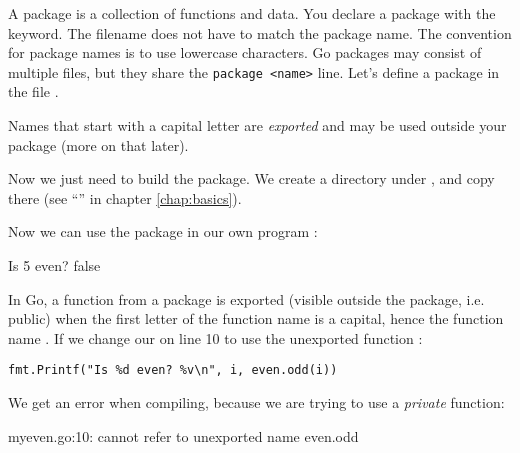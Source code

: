 \noindent{}A package is a collection of functions and data.
You declare a package with the
 keyword. The filename does not
have to match the package name.
The convention for package names is to use
lowercase characters.
Go packages may consist of multiple files,
but they share the \lstinline{package <name>} line.
Let's define a package  in the file .


Names that start with a capital letter are \emph{exported} and may be used
outside your package (more on that later).

Now we just need to build the package. We create a directory under ,
and copy  there (see ``'' in chapter \ref{chap:basics}).

\begin{display}
\pr {}	
\pr {} 	
\pr {}                     
\pr {}                   
\end{display}

Now we can use the package in our own program :


\showremarks

\begin{display}
\pr {}
\pr {}
Is 5 even? false
\end{display}

In Go, a function from a package is exported (visible
outside the package, i.e. public) when the first letter of the function name is a capital, hence
the function name . If we change our  on line
10 to use the unexported function :

\noindent\lstinline{fmt.Printf("Is %d even? %v\n", i, even.odd(i))}

We get an error when compiling, because we are trying to use a
\emph{private} function:
\begin{display}
myeven.go:10: cannot refer to unexported name even.odd
\end{display}

